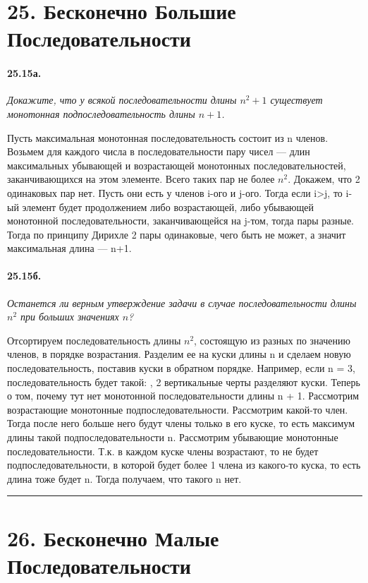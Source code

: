 \documentclass{book}
\begin{document}
\section*{25. Бесконечно Большие Последовательности}

\paragraph{25.15а.}
\textit{Докажите, что у всякой последовательности длины $n^2 + 1$ существует монотонная подпоследовательность длины $n+1$.}

Пусть максимальная монотонная последовательность состоит из n членов. Возьмем для каждого числа в последовательности пару чисел — длин максимальных убывающей и возрастающей монотонных последовательностей, заканчивающихся на этом элементе. Всего таких пар не более $n^2$. Докажем, что 2 одинаковых пар нет. Пусть они есть у членов i-ого и j-ого. Тогда если i>j, то i-ый элемент будет продолжением либо возрастающей, либо убывающей монотонной последовательности, заканчивающейся на j-том, тогда пары разные. Тогда по принципу Дирихле 2 пары одинаковые, чего быть не может, а значит максимальная длина — n+1.

\paragraph{25.15б.}
\textit{Останется ли верным утверждение задачи в случае последовательности длины $n^2$ при больших значениях $n$?}

Отсортируем последовательность длины $n^2$, состоящую из разных по значению членов, в порядке возрастания. Разделим ее на куски длины n и сделаем новую последовательность, поставив куски в обратном порядке. Например, если n = 3, последовательность будет такой: , 2 вертикальные черты разделяют куски. Теперь о том, почему тут нет монотонной последовательности длины n + 1. Рассмотрим возрастающие монотонные подпоследовательности. Рассмотрим какой-то член. Тогда после него больше него будут члены только в его куске, то есть максимум длины такой подпоследовательности n. Рассмотрим убывающие монотонные последовательности. Т.к. в каждом куске члены возрастают, то не будет подпоследовательности, в которой будет более 1 члена из какого-то куска, то есть длина тоже будет n. Тогда получаем, что такого n нет.

\medskip\hrule\medskip

\section*{26. Бесконечно Малые Последовательности}
 
\end{document}
